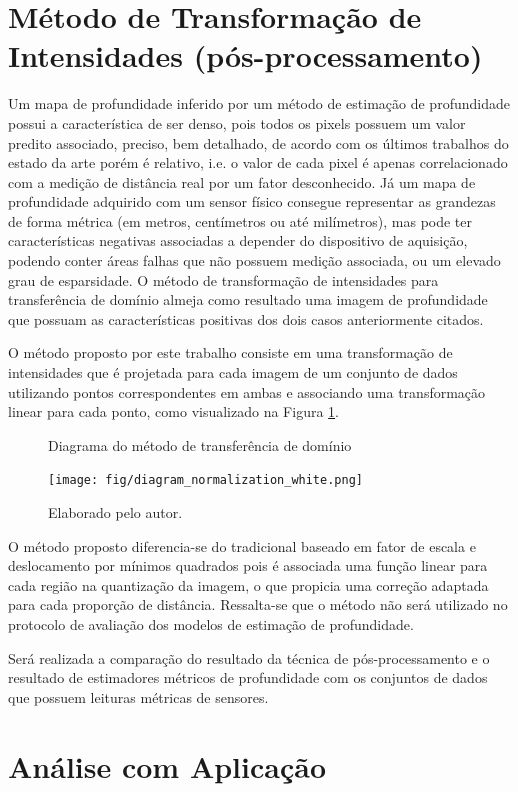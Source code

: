 \section{Método de Transformação de Intensidades (pós-processamento)}

Um mapa de profundidade inferido por um método de estimação de profundidade possui a característica de ser denso, pois todos os pixels possuem um valor predito associado, preciso, bem detalhado, de acordo com os últimos trabalhos do estado da arte porém é relativo, i.e. o valor de cada pixel é apenas correlacionado com a medição de distância real por um fator desconhecido. Já um mapa de profundidade adquirido com um sensor físico consegue representar as grandezas de forma métrica (em metros, centímetros ou até milímetros), mas pode ter características negativas associadas a depender do dispositivo de aquisição, podendo conter áreas falhas que não possuem medição associada, ou um elevado grau de esparsidade. O método de transformação de intensidades para transferência de domínio almeja como resultado uma imagem de profundidade que possuam as características positivas dos dois casos anteriormente citados. 

O método proposto por este trabalho consiste em uma transformação de intensidades que é projetada para cada imagem de um conjunto de dados utilizando pontos correspondentes em ambas e associando uma transformação linear para cada ponto, como visualizado na Figura \ref{posproc}. 


\begin{figure}[h]
    \centering
    \caption{Diagrama do método de transferência de domínio}
    \texttt{[image: fig/diagram\_normalization\_white.png]}
    \caption*{Elaborado pelo autor.}
    \label{posproc}
\end{figure}

O método proposto diferencia-se do tradicional baseado em fator de escala e deslocamento por mínimos quadrados pois é associada uma função linear para cada região na quantização da imagem, o que propicia uma correção adaptada para cada proporção de distância. Ressalta-se que o método não será utilizado no protocolo de avaliação dos modelos de estimação de profundidade.

Será realizada a comparação do resultado da técnica de pós-processamento e o resultado de estimadores métricos de profundidade com os conjuntos de dados que possuem leituras métricas de sensores.


\section{Análise com Aplicação}

